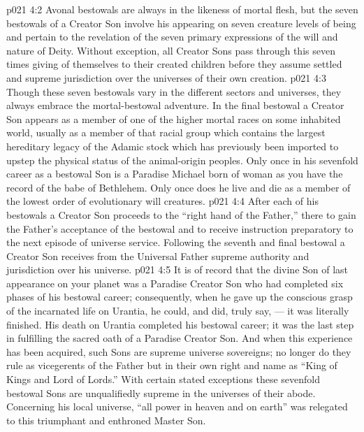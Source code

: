 \vs p021 4:2 Avonal bestowals are always in the likeness of mortal flesh, but the seven bestowals of a Creator Son involve his appearing on seven creature levels of being and pertain to the revelation of the seven primary expressions of the will and nature of Deity. Without exception, all Creator Sons pass through this seven times giving of themselves to their created children before they assume settled and supreme jurisdiction over the universes of their own creation.
\vs p021 4:3 Though these seven bestowals vary in the different sectors and universes, they always embrace the mortal\hyp{}bestowal adventure. In the final bestowal a Creator Son appears as a member of one of the higher mortal races on some inhabited world, usually as a member of that racial group which contains the largest hereditary legacy of the Adamic stock which has previously been imported to upstep the physical status of the animal\hyp{}origin peoples. Only once in his sevenfold career as a bestowal Son is a Paradise Michael born of woman as you have the record of the babe of Bethlehem. Only once does he live and die as a member of the lowest order of evolutionary will creatures.
\vs p021 4:4 After each of his bestowals a Creator Son proceeds to the “right hand of the Father,” there to gain the Father’s acceptance of the bestowal and to receive instruction preparatory to the next episode of universe service. Following the seventh and final bestowal a Creator Son receives from the Universal Father supreme authority and jurisdiction over his universe.
\vs p021 4:5 \pc It is of record that the divine Son of last appearance on your planet was a Paradise Creator Son who had completed six phases of his bestowal career; consequently, when he gave up the conscious grasp of the incarnated life on Urantia, he could, and did, truly say,  --- it was literally finished. His death on Urantia completed his bestowal career; it was the last step in fulfilling the sacred oath of a Paradise Creator Son. And when this experience has been acquired, such Sons are supreme universe sovereigns; no longer do they rule as vicegerents of the Father but in their own right and name as “King of Kings and Lord of Lords.” With certain stated exceptions these sevenfold bestowal Sons are unqualifiedly supreme in the universes of their abode. Concerning his local universe, “all power in heaven and on earth” was relegated to this triumphant and enthroned Master Son.
